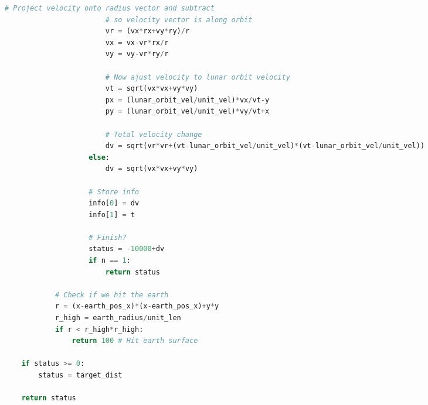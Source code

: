 \begin{adjustwidth*}{0cm}{-0.4cm}
\begin{lstlisting}[language=Python]
                        # Project velocity onto radius vector and subtract
                        # so velocity vector is along orbit
                        vr = (vx*rx+vy*ry)/r
                        vx = vx-vr*rx/r
                        vy = vy-vr*ry/r
                    
                        # Now ajust velocity to lunar orbit velocity
                        vt = sqrt(vx*vx+vy*vy)
                        px = (lunar_orbit_vel/unit_vel)*vx/vt-y
                        py = (lunar_orbit_vel/unit_vel)*vy/vt+x

                        # Total velocity change
                        dv = sqrt(vr*vr+(vt-lunar_orbit_vel/unit_vel)*(vt-lunar_orbit_vel/unit_vel))
                    else:
                        dv = sqrt(vx*vx+vy*vy)
                    
                    # Store info
                    info[0] = dv
                    info[1] = t

                    # Finish?
                    status = -10000+dv
                    if n == 1:
                        return status

            # Check if we hit the earth
            r = (x-earth_pos_x)*(x-earth_pos_x)+y*y
            r_high = earth_radius/unit_len
            if r < r_high*r_high:
                return 100 # Hit earth surface

    if status >= 0:
        status = target_dist

    return status
\end{lstlisting}
\end{adjustwidth*}

